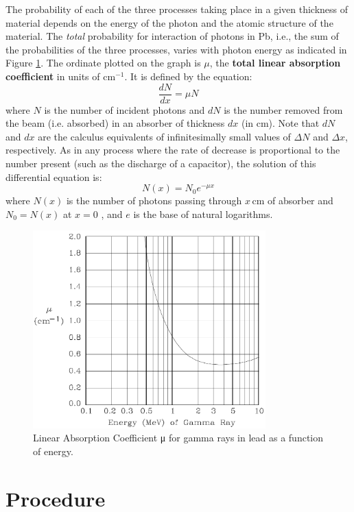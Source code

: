 The probability of each of the three processes taking place in a given thickness of material depends on the energy of the photon and the atomic structure of the material. The \emph{total} probability for interaction of photons in Pb, i.e., the sum of the probabilities of the three processes, varies with photon energy as indicated in Figure {\ref{fig:linear}}. The ordinate plotted on the graph is $\mu$, the \textbf{total linear absorption coefficient} in units of $\mathrm{cm}^{-1}$. It is defined by the equation:
\begin{equation}
  \frac{d N}{d x}=\mu N
\end{equation}
where $N$ is the number of incident photons and $dN$ is the number removed from the beam (i.e. absorbed) in an absorber of thickness $dx$ (in cm). Note that $dN$ and $dx$ are the calculus equivalents of infinitesimally small values of $\Delta N$ and $\Delta x$, respectively. As in any process where the rate of decrease is proportional to the number present (such as the discharge of a capacitor), the solution of this differential equation is:
\begin{equation}
  N(x)=N_{0}e^{-\mu x}
\label{eq:nx}
\end{equation}
where $N(x)$ is the number of photons passing through $x\,\mathrm{cm}$ of absorber and $N_0=N(x)$ at $x = 0$ , and $e$ is the base of natural logarithms.
\begin{figure}[h]
\centering
\includegraphics[width=0.8\textwidth]{./Exp10/pic/image6.png}
\caption{Linear Absorption Coefficient μ for gamma rays in lead as a function of energy.}
\label{fig:linear}
\end{figure} 

\section{Procedure}
